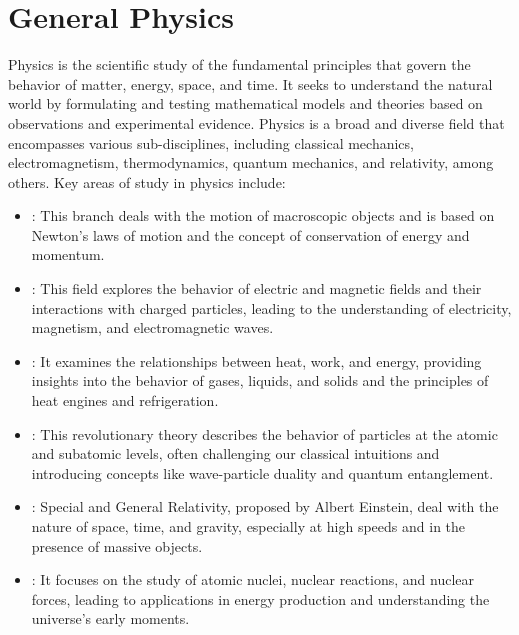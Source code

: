 \chapter{General Physics}
\thispagestyle{fancy}

Physics is the scientific study of the fundamental principles that govern the behavior of matter, energy, space, and time. It seeks to understand the natural world by formulating and testing mathematical models and theories based on observations and experimental evidence. Physics is a broad and diverse field that encompasses various sub-disciplines, including classical mechanics, electromagnetism, thermodynamics, quantum mechanics, and relativity, among others. Key areas of study in physics include:

\begin{itemize}
	\item {}: This branch deals with the motion of macroscopic objects and is based on Newton's laws of motion and the concept of conservation of energy and momentum.

	\item {}: This field explores the behavior of electric and magnetic fields and their interactions with charged particles, leading to the understanding of electricity, magnetism, and electromagnetic waves.

	\item {}: It examines the relationships between heat, work, and energy, providing insights into the behavior of gases, liquids, and solids and the principles of heat engines and refrigeration.

	\item {}: This revolutionary theory describes the behavior of particles at the atomic and subatomic levels, often challenging our classical intuitions and introducing concepts like wave-particle duality and quantum entanglement.

	\item {}: Special and General Relativity, proposed by Albert Einstein, deal with the nature of space, time, and gravity, especially at high speeds and in the presence of massive objects.

	\item {}: It focuses on the study of atomic nuclei, nuclear reactions, and nuclear forces, leading to applications in energy production and understanding the universe's early moments.


\end{itemize}
